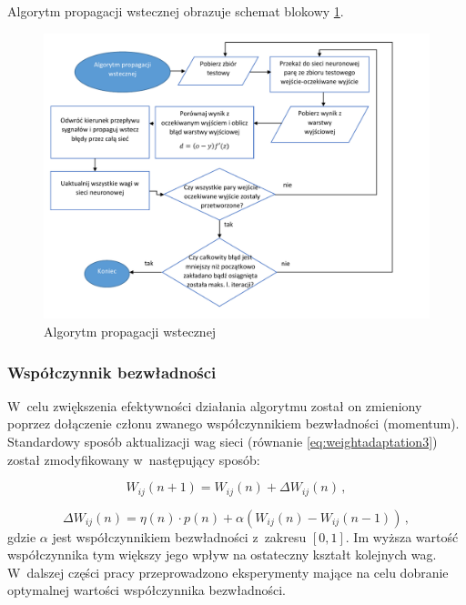 \documentclass[twoside]{iisthesis}
\begin{document}
	 Algorytm propagacji wstecznej obrazuje schemat blokowy \ref{fig:propagacjawsteczna}.
	 
	 \begin{figure}[!ht] 
			 	\centering
			 	\includegraphics[width=1\textwidth]{propagacjawsteczna}
			 	\caption{Algorytm propagacji wstecznej}
			 	\label{fig:propagacjawsteczna}
	 \end{figure}
	 
	 \subsubsection{Współczynnik bezwładności}
	 \label{sss:metoda_momentum}
	 
	 W~celu zwiększenia efektywności działania algorytmu został on zmieniony poprzez dołączenie członu zwanego współczynnikiem bezwładności (momentum). Standardowy sposób aktualizacji wag sieci (równanie \ref{eq:weightadaptation3}) został zmodyfikowany w~następujący sposób:
	 
	 \begin{equation}
	 \label{eq:zasadamomentum1}
	 W_{ij}(n+1) = W_{ij}(n) + \Delta W_{ij}(n) 
	 \,,
	 \end{equation}
	 
	 \begin{equation}
	 \label{eq:zasadamomentum2}
	 \Delta W_{ij}(n) = \eta(n) \cdot p(n) + \alpha(W_{ij}(n)-W_{ij}(n-1)) 
	 \,,
	 \end{equation}		 
	 gdzie $\alpha$ jest współczynnikiem bezwładności z~zakresu $[0,1]$. Im wyższa wartość współczynnika tym większy jego wpływ na ostateczny kształt kolejnych wag. W~dalszej części pracy przeprowadzono eksperymenty mające na celu dobranie optymalnej wartości współczynnika bezwładności.
	 
\end{document}
